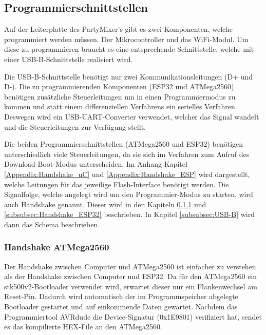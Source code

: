 \clearpage
\subsection{Programmierschnittstellen}
\label{subsec:Programmierschnittstellen}

Auf der Leiterplatte des PartyMixer's gibt es zwei Komponenten, welche programmiert werden müssen. Der Mikrocontroller und das WiFi-Modul. Um diese zu programmieren braucht es eine entsprechende Schnittstelle, welche mit einer USB-B-Schnittstelle realisiert wird.

Die USB-B-Schnittstelle benötigt nur zwei Kommunikationsleitungen (D+ und D-). Die zu programmierenden Komponenten (ESP32 und ATMega2560) benötigen zusätzliche Steuerleitungen um in einen Programmiermodus zu kommen und statt einem differenziellen Verfahrens ein serielles Verfahren. Deswegen wird ein USB-UART-Converter verwendet, welcher das Signal wandelt und die Steuerleitungen zur Verfügung stellt.

Die beiden Programmierschnittstellen (ATMega2560 und ESP32) benötigen unterschiedlich viele Steuerleitungen, da sie sich im Verfahren zum Aufruf des Download-Boot-Modus unterscheiden. Im Anhang Kapitel \ref{Appendix:Handshake_uC} und \ref{Appendix:Handshake_ESP} wird dargestellt, welche Leitungen für das jeweilige Flash-Interface benötigt werden. Die Signalfolge, welche angelegt wird um den Programmier-Modus zu starten, wird auch Handshake genannt. Dieser wird in den Kapiteln \ref{subsubsec:Handshake_ATMega2560} und \ref{subsubsec:Handshake_ESP32} beschrieben. In Kapitel \ref{subsubsec:USB-B} wird dann das Schema beschrieben.

\subsubsection{Handshake ATMega2560}\label{subsubsec:Handshake_ATMega2560}

Der Handshake zwischen Computer und ATMega2560 ist einfacher zu verstehen als der Handshake zwischen Computer und ESP32. Da für den ATMega2560 ein stk500v2-Bootloader verwendet wird, erwartet dieser nur ein Flankenwechsel am Reset-Pin. Dadurch wird automatisch der im Programmspeicher abgelegte Bootloader gestartet und auf einkommende Daten gewartet. Nachdem das Programmiertool AVRdude die Device-Signatur (0x1E9801) verifiziert hat, sendet es das kompilierte HEX-File an den ATMega2560.

